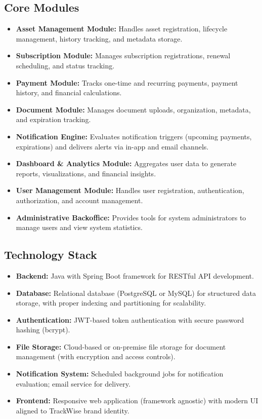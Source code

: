 \documentclass[11pt, a4paper]{article}
\begin{document}
	\subsection{Core Modules}
	\begin{itemize}
		\item \textbf{Asset Management Module:} Handles asset registration, lifecycle management, history tracking, and metadata storage.
		\item \textbf{Subscription Module:} Manages subscription registrations, renewal scheduling, and status tracking.
		\item \textbf{Payment Module:} Tracks one-time and recurring payments, payment history, and financial calculations.
		\item \textbf{Document Module:} Manages document uploads, organization, metadata, and expiration tracking.
		\item \textbf{Notification Engine:} Evaluates notification triggers (upcoming payments, expirations) and delivers alerts via in-app and email channels.
		\item \textbf{Dashboard \& Analytics Module:} Aggregates user data to generate reports, visualizations, and financial insights.
		\item \textbf{User Management Module:} Handles user registration, authentication, authorization, and account management.
		\item \textbf{Administrative Backoffice:} Provides tools for system administrators to manage users and view system statistics.
	\end{itemize}
	
	\subsection{Technology Stack}
	\begin{itemize}
		\item \textbf{Backend:} Java with Spring Boot framework for RESTful API development.
		\item \textbf{Database:} Relational database (PostgreSQL or MySQL) for structured data storage, with proper indexing and partitioning for scalability.
		\item \textbf{Authentication:} JWT-based token authentication with secure password hashing (bcrypt).
		\item \textbf{File Storage:} Cloud-based or on-premise file storage for document management (with encryption and access controls).
		\item \textbf{Notification System:} Scheduled background jobs for notification evaluation; email service for delivery.
		\item \textbf{Frontend:} Responsive web application (framework agnostic) with modern UI aligned to TrackWise brand identity.
	\end{itemize}
	
\end{document}
